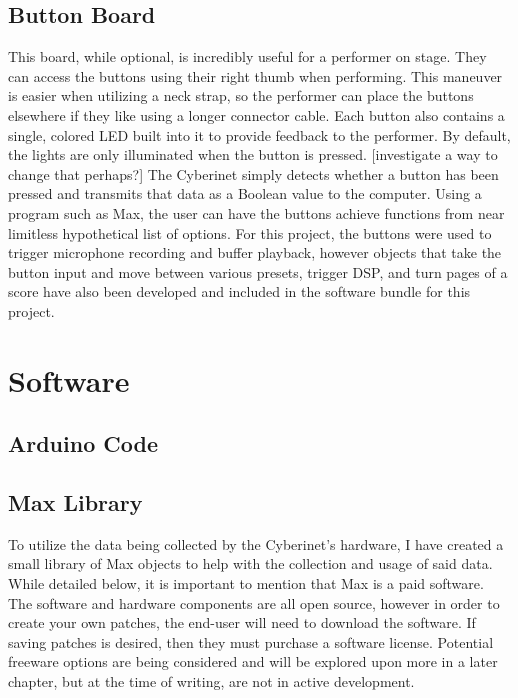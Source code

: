 \section{Button Board}
This board, while optional, is incredibly useful for a performer on stage. They can access the buttons using their right thumb when performing. This maneuver is easier when utilizing a neck strap, so the performer can place the buttons elsewhere if they like using a longer connector cable. Each button also contains a single, colored LED built into it to provide feedback to the performer. By default, the lights are only illuminated when the button is pressed. [investigate a way to change that perhaps?] The Cyberinet simply detects whether a button has been pressed and transmits that data as a Boolean value to the computer. Using a program such as Max, the user can have the buttons achieve functions from near limitless hypothetical list of options. For this project, the buttons were used to trigger microphone recording and buffer playback, however objects that take the button input and move between various presets, trigger DSP, and turn pages of a score have also been developed and included in the software bundle for this project.

\chapter{Software}

\section{Arduino Code}

\section{Max Library}

To utilize the data being collected by the Cyberinet’s hardware, I have created a small library of Max objects to help with the collection and usage of said data. While detailed below, it is important to mention that Max is a paid software. The software and hardware components are all open source, however in order to create your own patches, the end-user will need to download the software. If saving patches is desired, then they must purchase a software license. Potential freeware options are being considered and will be explored upon more in a later chapter, but at the time of writing, are not in active development.

